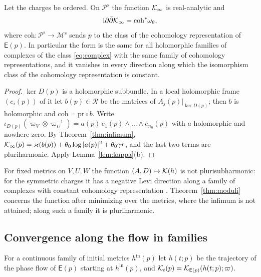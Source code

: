 \begin{theorem}\label{thm:moduli}
Let the charges be ordered. On $\mathcal P^{\mathrm s}$ the function
$\mathcal K_\infty$ is real-analytic and
\[
 \mathrm i\partial\bar\partial\mathcal K_\infty=\mathrm{coh}^*\omega_\theta,
\]
where $\mathrm{coh}:\mathcal P^{\mathrm s}\to\mathcal M^{\mathrm s}$ sends $p$
to the class of the cohomology representation of $\mathsf E(p)$. In
particular the form is the same for all holomorphic families of complexes of
the class \eqref{eq:complex} with the same family of cohomology
representations, and it vanishes in every direction along which the
isomorphism class of the cohomology representation is constant.
\end{theorem}

\begin{proof}
$\ker D(p)$ is a holomorphic subbundle. In a local holomorphic frame
$(e_i(p))$ of it let $b(p)\in\mathcal R$ be the matrices of
$A_j(p)|_{\ker D(p)}$; then $b$ is holomorphic and
$\mathrm{coh}=\mathrm{pr}\circ b$. Write
$\iota_{D(p)}(\varpi_V\otimes\varpi_U^{-1})=a(p)\,e_1(p)\wedge\dots\wedge e_{n_0}(p)$
with $a$ holomorphic and nowhere zero. By Theorem~\ref{thm:infimum},
$\mathcal K_\infty(p)=\varkappa(b(p))+\theta_0\log|a(p)|^2+\theta_0\gamma r$, and the
last two terms are pluriharmonic. Apply Lemma~\ref{lem:kappa}(b).
\end{proof}

\begin{remark}\label{rem:levi}
For fixed metrics on $V,U,W$ the function $(A,D)\mapsto\mathcal K(h)$ is not
plurisubharmonic: for the symmetric charges it has a negative Levi direction
along a family of complexes with constant cohomology representation
\cite[Proposition~7.5]{wue26}. Theorem~\ref{thm:moduli} concerns the function
after minimizing over the metrics, where the infimum is not attained; along
such a family it is pluriharmonic.
\end{remark}

\subsection{Convergence along the flow in families}
For a continuous family of initial metrics $h^{\mathrm{in}}(p)$ let $h(t;p)$ be
the trajectory of the phase flow of $\mathsf E(p)$ starting at
$h^{\mathrm{in}}(p)$, and $\mathcal K_t(p)=\mathcal K_{\mathsf E(p)}(h(t;p);\varpi)$.

